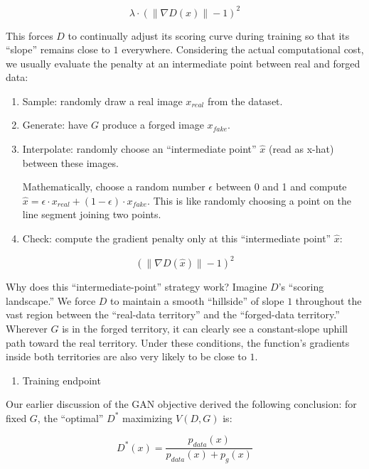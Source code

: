 \[
\lambda \cdot (\lVert \nabla D(x) \rVert - 1)^2
\]

This forces \(D\) to continually adjust its scoring curve during training so that its ``slope'' remains close to \(1\) everywhere. Considering the actual computational cost, we usually evaluate the penalty at an intermediate point between real and forged data:

\begin{enumerate}
\def\labelenumi{\arabic{enumi}.}
\item
  Sample: randomly draw a real image \(x_{real}\) from the dataset.
\item
  Generate: have \(G\) produce a forged image \(x_{fake}\).
\item
  Interpolate: randomly choose an ``intermediate point'' \(\hat{x}\) (read as x-hat) between these images.

  Mathematically, choose a random number \(\epsilon\) between 0 and 1 and compute \(\hat{x}=\epsilon\cdot x_{real}+(1-\epsilon)\cdot x_{fake}\). This is like randomly choosing a point on the line segment joining two points.
\item
{}
  Check: compute the gradient penalty only at this ``intermediate point'' \(\hat{x}\):
\end{enumerate}

\[
(\lVert \nabla D(\hat{x}) \rVert - 1)^2
\]

Why does this ``intermediate-point'' strategy work? Imagine \(D\)'s ``scoring landscape.'' We force \(D\) to maintain a smooth ``hillside'' of slope \(1\) throughout the vast region between the ``real-data territory'' and the ``forged-data territory.'' Wherever \(G\) is in the forged territory, it can clearly see a constant-slope uphill path toward the real territory. Under these conditions, the function's gradients inside both territories are also very likely to be close to \(1\).

\begin{enumerate}
\def\labelenumi{\arabic{enumi}.}
\setcounter{enumi}{2}
\tightlist
\item
  Training endpoint
\end{enumerate}

Our earlier discussion of the GAN objective derived the following conclusion: for fixed \(G\), the ``optimal'' \(D^*\) maximizing \(V(D,G)\) is:

\[
D^*(x)=\frac{p_{data}(x)}{p_{data}(x)+p_g(x)}
\]

